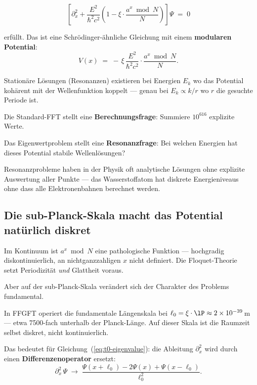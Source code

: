 \begin{equation}
  \label{eq:t0-eigenvalue}
  \left[\partial_x^2 + \frac{E^2}{\hbar^2 c^2}
  \left(1 - \xi \cdot \frac{a^x \bmod N}{N}\right)
  \right] \Psi \;=\; 0
\end{equation}

erfüllt. Das ist eine Schrödinger-ähnliche Gleichung
mit einem \textbf{modularen Potential}:
\begin{equation}
  V(x) \;=\; -\,\xi\,\frac{E^2}{\hbar^2 c^2}
  \cdot \frac{a^x \bmod N}{N}.
\end{equation}

Stationäre Lösungen (Resonanzen) existieren bei Energien
$E_k$ wo das Potential kohärent mit der Wellenfunktion
koppelt --- genau bei
$E_k \propto k/r$
wo $r$ die gesuchte Periode ist.

\begin{keypoint}
Die Standard-FFT stellt eine \textbf{Berechnungsfrage}:
Summiere $10^{616}$ explizite Werte.

Das Eigenwertproblem stellt eine \textbf{Resonanzfrage}:
Bei welchen Energien hat dieses Potential
stabile Wellenlösungen?

Resonanzprobleme haben in der Physik oft analytische
Lösungen ohne explizite Auswertung aller Punkte ---
das Wasserstoffatom hat diskrete Energieniveaus
ohne dass alle Elektronenbahnen berechnet werden.
\end{keypoint}

\subsection{Die sub-Planck-Skala macht das Potential
  natürlich diskret}

Im Kontinuum ist $a^x \bmod N$ eine pathologische Funktion ---
hochgradig diskontinuierlich, an nichtganzzahligen $x$
nicht definiert. Die Floquet-Theorie setzt Periodizität
\emph{und} Glattheit voraus.

Aber auf der sub-Planck-Skala verändert sich der Charakter
des Problems fundamental.

In FFGFT operiert die fundamentale Längenskala bei
$\ell_0 = \xi \cdot \lP \approx 2 \times 10^{-39}$\,m ---
etwa 7500-fach unterhalb der Planck-Länge.
Auf dieser Skala ist die Raumzeit selbst diskret,
nicht kontinuierlich.

Das bedeutet für Gleichung~(\ref{eq:t0-eigenvalue}):
die Ableitung $\partial_x^2$ wird durch einen
\textbf{Differenzenoperator} ersetzt:
\begin{equation}
  \partial_x^2\,\Psi \;\longrightarrow\;
  \frac{\Psi(x+\ell_0) - 2\Psi(x) + \Psi(x-\ell_0)}
       {\ell_0^2}.
\end{equation}

